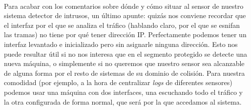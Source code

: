 \\Para acabar con los comentarios sobre d\'onde y c\'omo situar al sensor de
nuestro sistema detector de intrusos, un \'ultimo apunte: quiz\'as nos conviene
recordar que el interfaz por el que se analiza el tr\'afico (hablando claro, 
por el que se esnifan las tramas) no tiene por qu\'e tener direcci\'on IP.
Perfectamente podemos tener un interfaz levantado e inicializado pero sin 
asignarle ninguna direcci\'on. Esto nos puede resultar \'util si no nos interesa
que en el segmento protegido se detecte una nueva m\'aquina, o simplemente si 
no queremos que nuestro sensor sea alcanzable de alguna forma por el resto 
de sistemas de su dominio de colisi\'on. Para nuestra comodidad (por ejemplo,
a la hora de centralizar {\it logs} de diferentes sensores) podemos usar una 
m\'aquina con dos interfaces, una escuchando todo el tr\'afico y la otra 
configurada de forma normal, que ser\'a por la que accedamos al sistema.

